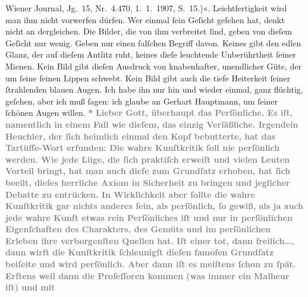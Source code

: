 \begin{ledgroupsized}[t]{13cm}
{{{{{{                        Wiener Journal}, Jg. 15, Nr. 4.470, 1. 1. 1907, S. 15.)}}}\label{K_L03438-5h}«. Leichtfertigkeit wird man ihm nicht
                  vorwerfen dürfen. Wer einmal ſein Geſicht geſehen hat, denkt nicht an dergleichen.
                  Die Bilder, die von ihm verbreitet ſind, geben von dieſem Geſicht nur wenig. Geben
                  nur einen falſchen Begriff davon. Keines gibt den edlen Glanz, der auf dieſem
                  Antlitz ruht, keines dieſe leuchtende Unberührtheit ſeiner Mienen. Kein Bild gibt
                  dieſen Ausdruck von knabenhafter, unendlicher Güte, der um ſeine feinen Lippen
                  schwebt. Kein Bild gibt auch die tiefe Heiterkeit ſeiner ſtrahlenden blauen Augen.
                  Ich habe ihn nur hin und wieder einmal, ganz flüchtig, geſehen, aber ich muß
                  ſagen: ich glaube {\pb}an Gerhart Hauptmann, um ſeiner ſchönen Augen
                  willen.}}\pend
           \pstart
           \centering{}\textcolor{gray}{\textbf{*}}\pend
           \pstart
           \noindent{}\textcolor{gray}{\textbf{Lieber Gott, überhaupt das Perſönliche. Es iſt, namentlich in
                  einem Fall wie dieſem, das einzig Verläßliche. Irgendein Heuchler, der ſich
                  heimlich einmal den Kopf bebutterte, hat das Tartüffe-Wort erfunden: Die wahre Kunſtkritik ſoll nie
                  perſönlich werden. Wie jede Lüge, die ſich praktiſch erweiſt und vielen Leuten
                  Vorteil bringt, hat man auch dieſe zum Grundſatz erhoben, hat ſich beeilt, dieſes
                  herrliche Axiom in Sicherheit zu bringen und jeglicher Debatte zu entrücken. In
                  Wirklichkeit aber ſollte die wahre Kunſtkritik gar nichts anderes ſein, als
                  perſönlich, ſo gewiß, als ja auch jede wahre Kunſt etwas rein Perſönliches iſt und
                  nur in perſönlichen Eigenſchaften des Charakters, des Gemüts und im perſönlichen
                  Erleben ihre verborgenſten Quellen hat. Iſt einer tot, dann freilich{\dots}, dann wirft die Kunſtkritik ſchleunigſt dieſen
                  famoſen Grundſatz beiſeite und wird perſönlich. Aber dann iſt es meiſtens ſchon zu
                  ſpät. Erſtens weil dann die Profeſſoren kommen (was immer ein Malheur iſt) und mit
}}
\end{ledgroupsized}
